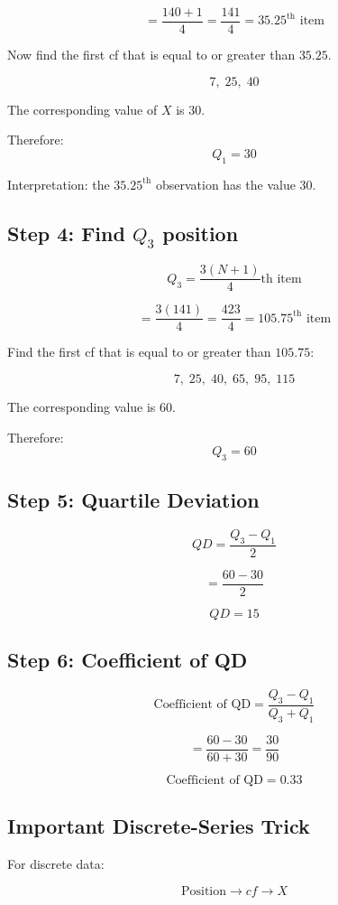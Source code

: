 \documentclass[12pt,a4paper]{article}
\begin{document}
\[
=\frac{140+1}{4}
=\frac{141}{4}
=35.25^{\text{th}}\text{ item}
\]

Now find the first cf that is equal to or greater than $35.25$.

\[
7,\;25,\;\boxed{40}
\]

The corresponding value of $X$ is $30$.

Therefore:
\[
\boxed{Q_1=30}
\]

Interpretation: the $35.25^{\text{th}}$ observation has the value $30$.

\subsection*{Step 4: Find $Q_3$ position}

\[
Q_3=\frac{3(N+1)}{4}\text{th item}
\]

\[
=\frac{3(141)}{4}
=\frac{423}{4}
=105.75^{\text{th}}\text{ item}
\]

Find the first cf that is equal to or greater than $105.75$:

\[
7,\;25,\;40,\;65,\;95,\;\boxed{115}
\]

The corresponding value is $60$.

Therefore:
\[
\boxed{Q_3=60}
\]

\subsection*{Step 5: Quartile Deviation}

\[
QD=\frac{Q_3-Q_1}{2}
\]

\[
=\frac{60-30}{2}
\]

\[
\boxed{QD=15}
\]

\subsection*{Step 6: Coefficient of QD}

\[
\text{Coefficient of QD}
=
\frac{Q_3-Q_1}{Q_3+Q_1}
\]

\[
=
\frac{60-30}{60+30}
=
\frac{30}{90}
\]

\[
\boxed{\text{Coefficient of QD}=0.33}
\]

\subsection*{Important Discrete-Series Trick}

For discrete data:

\[
\boxed{
\text{Position}\rightarrow cf\rightarrow X
}
\]
\end{document}
